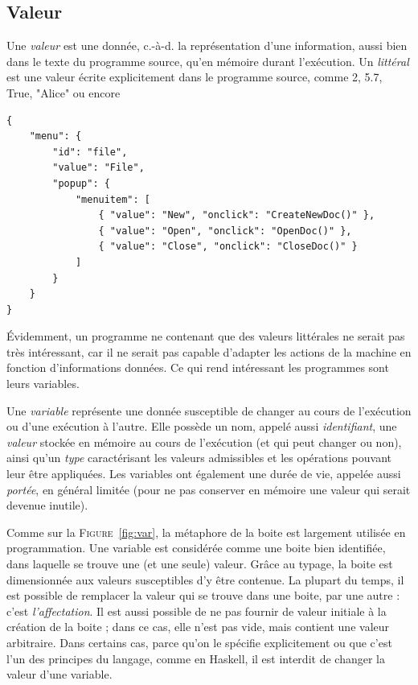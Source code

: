 \documentclass[a4paper,francais]{insalyon}
\newcommand{\cad}{c.-à-d.}
\begin{document}
\subsection{Valeur}

Une \emph{valeur} est une donnée, {\cad} la représentation d'une information, aussi bien dans le texte du programme source, qu'en mémoire durant l'exécution. 
Un \emph{littéral} est une valeur écrite explicitement dans le programme source, comme 2, 5.7, True, "Alice" ou encore
\begin{verbatim}
{
    "menu": {
        "id": "file",
        "value": "File",
        "popup": {
            "menuitem": [
                { "value": "New", "onclick": "CreateNewDoc()" },
                { "value": "Open", "onclick": "OpenDoc()" },
                { "value": "Close", "onclick": "CloseDoc()" }
            ]
        }
    }
}
\end{verbatim}
\'Evidemment, un programme ne contenant que des valeurs littérales ne serait pas très intéressant, car il ne serait pas capable d'adapter les actions de la machine en fonction d'informations données. Ce qui rend intéressant les programmes sont leurs variables. 

Une \emph{variable} représente une donnée susceptible de changer au cours de l'exécution ou d'une exécution à l'autre. Elle possède un nom, appelé aussi \emph{identifiant}, une \emph{valeur} stockée en mémoire au cours de l'exécution (et qui peut changer ou non), ainsi qu'un \emph{type} caractérisant les valeurs admissibles et les opérations pouvant leur être appliquées. Les variables ont également une durée de vie, appelée aussi \emph{portée}, en général limitée (pour ne pas conserver en mémoire une valeur qui serait devenue inutile).  

Comme sur la \textsc{Figure}~\ref{fig:var}, la métaphore de la boite est largement utilisée en programmation. Une variable est considérée comme une boite bien identifiée, dans laquelle se trouve une (et une seule) valeur. Grâce au typage, la boite est dimensionnée aux valeurs susceptibles d'y être contenue. La plupart du temps, il est possible de remplacer la valeur qui se trouve dans une boite, par une autre : c'est \emph{l'affectation}. Il est aussi possible de ne pas fournir de valeur initiale à la création de la boite ; dans ce cas, elle n'est pas vide, mais contient une valeur arbitraire. Dans certains cas, parce qu'on le spécifie explicitement ou que c'est l'un des principes du langage, comme en Haskell, il est interdit de changer la valeur d'une variable.
\end{document}
